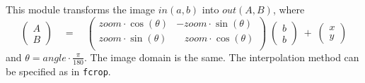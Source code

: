 This module transforms the image $in(a,b)$ into $out(A,B)$, where
$$\left( \begin{array}{c} A \\ B \end{array} \right) \quad
= \quad 
\left( \begin{array}{cc} zoom \cdot \cos(\theta) & - zoom \cdot\sin(\theta) \\
zoom \cdot \sin(\theta) & \;\;\;zoom\cdot\cos(\theta) \\ \end{array} \right) \;
\left( \begin{array}{c} b \\ b \end{array} \right) \;+\;
\left( \begin{array}{c} x \\ y  \end{array} \right)$$
and $\displaystyle \theta = angle \cdot \frac{\pi}{180}$.
The image domain is the same. The interpolation method can be specified
as in \verb+fcrop+.
